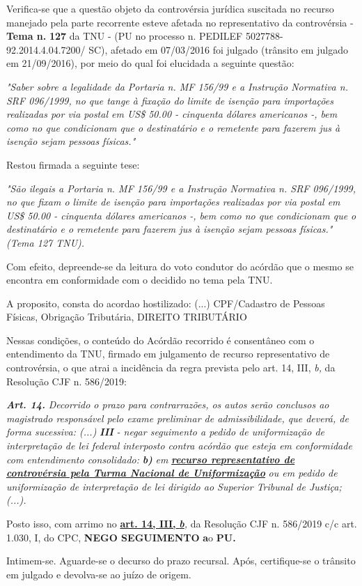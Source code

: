 \documentclass[12pt]{article}
\begin{document}
\justifying
\noindent Verifica-se que a questão objeto da controvérsia jurídica suscitada no recurso manejado pela parte recorrente esteve afetada no representativo da controvérsia - \textbf{Tema n. }\textbf{127} da TNU - (PU no processo n. PEDILEF 5027788-92.2014.4.04.7200/ SC),  afetado em 07/03/2016 foi julgado (trânsito em julgado em 21/09/2016), por meio do qual foi elucidada a seguinte questão:

\noindent \textit{"Saber sobre a legalidade da Portaria n. MF 156/99 e a Instrução Normativa n. SRF 096/1999, no que tange à fixação do limite de isenção para importações realizadas por via postal em US\$ 50.00 - cinquenta dólares americanos -, bem como no que condicionam que o destinatário e o remetente para fazerem jus à isenção sejam pessoas físicas."}

\noindent Restou firmada a seguinte tese:

\noindent \textit{"São ilegais a Portaria n. MF 156/99 e a Instrução Normativa n. SRF 096/1999, no que fixam o limite de isenção para importações realizadas por via postal em US\$ 50.00 - cinquenta dólares americanos -, bem como no que condicionam que o destinatário e o remetente para fazerem jus à isenção sejam pessoas físicas." (Tema 127 TNU).}

\noindent Com efeito, depreende-se da leitura do voto condutor do acórdão que o mesmo se encontra em conformidade com o decidido no  tema pela TNU.

\noindent A proposito, consta do acordao hostilizado: (...) CPF/Cadastro de Pessoas Físicas, Obrigação Tributária, DIREITO TRIBUTÁRIO

\noindent Nessas condições, o conteúdo do Acórdão recorrido é consentâneo com o entendimento da TNU, firmado em julgamento de recurso representativo de controvérsia, o que atrai a incidência da regra prevista pelo art. 14, III, \textit{b,} da Resolução CJF n. 586/2019:

\noindent \textit{\textbf{Art. 14.}}\textit{ Decorrido o prazo para contrarrazões, os autos serão conclusos ao magistrado responsável pelo exame preliminar de admissibilidade, que deverá, de forma sucessiva: (...) }\textit{\textbf{III }}\textit{- negar seguimento a pedido de uniformização de interpretação de lei federal interposto contra acórdão que esteja em conformidade com entendimento consolidado: }\textit{\textbf{b)}}\textit{ em }\uline{\textit{\textbf{recurso representativo de controvérsia pela Turma Nacional de Uniformização}}}\textit{ ou em pedido de uniformização de interpretação de lei dirigido ao Superior Tribunal de Justiça;(...).}

\noindent Posto isso, com arrimo no \uline{\textbf{art. 14, III, }}\uline{\textit{\textbf{b}}}\textit{,} da Resolução CJF n. 586/2019 c/c art. 1.030, I, do CPC, \textbf{NEGO SEGUIMENTO }\textbf{a}o\textbf{ PU}\textbf{.}

\noindent Intimem-se. Aguarde-se o decurso do prazo recursal. Após, certifique-se o trânsito em julgado e devolva-se ao juízo de origem.
\end{document}
